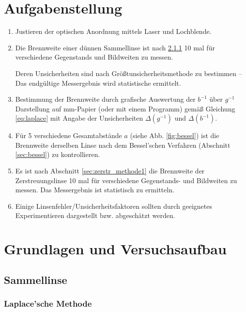 \documentclass{article}
\begin{document}
\parindent0cm




\pagestyle{fancy}

\section{Aufgabenstellung}

\begin{enumerate}
\item Justieren der optischen Anordnung mittels Laser und Lochblende.
\item Die Brennweite einer dünnen Sammellinse ist nach \ref{sec:laplace} 10 mal für verschiedene Gegenstands und Bildweiten zu messen.

Deren Unsicherheiten sind nach Größtunsicherheitsmethode zu bestimmen -- Das endgültige Messergebnis wird statistische ermittelt.
\item Bestimmung der Brennweite durch grafische Auswertung der $b^{-1}$ über $g^{-1}$ Darstellung auf mm-Papier (oder mit einem Programm) gemäß Gleichung \eqref{eq:laplace} mit Angabe der Unsicherheiten $\Delta(g^{-1})$ und $\Delta(b^{-1})$.

\item Für 5 verschiedene Gesamtabstände $a$ (siehe Abb. \ref{fig:bessel}) ist die Brennweite derselben Linse nach dem Bessel'schen Verfahren (Abschnitt \ref{sec:bessel}) zu kontrollieren.

\item Es ist nach Abschnitt \ref{sec:zerstr_methode1} die Brennweite der Zerstreuungslinse 10 mal für verschiedene Gegenstands- und Bildweiten zu messen. Das Messergebnis ist statistisch zu ermitteln.

\item Einige Linsenfehler/Unsicherheitsfaktoren sollten durch geeignetes Experimentieren dargestellt bzw. abgeschätzt werden.
\end{enumerate}


\section{Grundlagen und Versuchsaufbau}

\subsection{Sammellinse}

\subsubsection{Laplace'sche Methode}
\label{sec:laplace}
\end{document}
